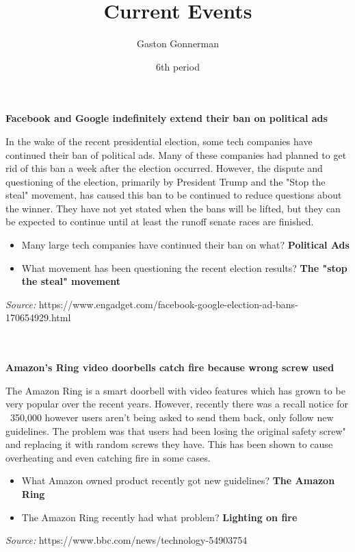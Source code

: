 \documentclass{article}
\title{Current Events}
\author{Gaston Gonnerman}
\date{6th period}
\begin{document}
	\maketitle
	
	\begin{center}
		\large{
			\textbf{Facebook and Google indefinitely extend their ban on political ads}
		}
	\end{center}
	\par In the wake of the recent presidential election, some tech companies have continued their ban of political ads. Many of these companies had planned to get rid of this ban a week after the election occurred. However, the dispute and questioning of the election, primarily by President Trump and the "Stop the steal" movement, has caused this ban to be continued to reduce questions about the winner. They have not yet stated when the bans will be lifted, but they can be expected to continue until at least the runoff senate races are finished.
	
	\begin{itemize}[label=--]
		\item Many large tech companies have continued their ban on what? \textbf{Political Ads}
		\item What movement has been questioning the recent election results? \textbf{The "stop the steal" movement}
	\end{itemize}

	\noindent
	\emph{Source:} https://www.engadget.com/facebook-google-election-ad-bans-170654929.html
	\\ \\ \\
	
	\begin{center}
		\large{
			\textbf{Amazon's Ring video doorbells catch fire because wrong screw used}
		}
	\end{center}
	\par The Amazon Ring is a smart doorbell with video features which has grown to be very popular over the recent years. However, recently there was a recall notice for ~350,000 however users aren't being asked to send them back, only follow new guidelines. The problem was that users had been losing the original safety screw" and replacing it with random screws they have. This has been shown to cause overheating and even catching fire in some cases.
	
	\begin{itemize}[label=--]
		\item What Amazon owned product recently got new guidelines? \textbf{The Amazon Ring}
		\item The Amazon Ring recently had what problem? \textbf{Lighting on fire}
	\end{itemize}

	\noindent
	\emph{Source:} https://www.bbc.com/news/technology-54903754
\end{document}
